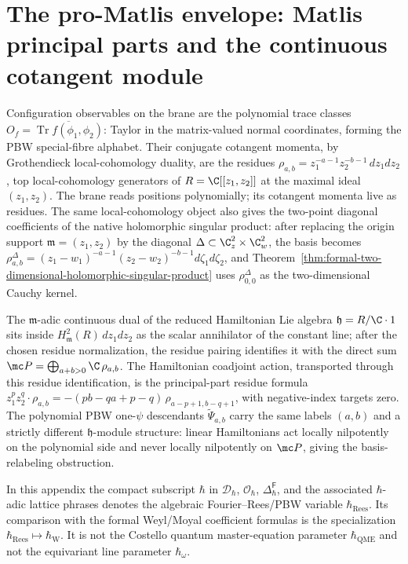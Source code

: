 \section{The pro-Matlis envelope: Matlis principal parts and the continuous cotangent module}\label{sec:pro-matlis-target}\label{sec:app-matlis-principal-parts}

Configuration observables on the brane are the polynomial trace
classes \(O_f=\overline{\operatorname{Tr}f(\phi_1,\phi_2)}\): Taylor
in the matrix-valued normal coordinates, forming the PBW
special-fibre alphabet.  Their conjugate cotangent momenta, by
Grothendieck local-cohomology duality, are the residues
\(\rho_{a,b}=z_1^{-a-1}z_2^{-b-1}\,dz_1dz_2\), top local-cohomology
generators of \(R=\C[[z_1,z_2]]\) at the maximal ideal \((z_1,z_2)\).
The brane reads positions polynomially; its cotangent momenta live as
residues.  The same local-cohomology object also gives the
two-point diagonal coefficients of the native holomorphic singular
product: after replacing
the origin support \(\mathfrak m=(z_1,z_2)\) by the diagonal
\(\Delta\subset\C^2_z\times\C^2_w\), the basis becomes
\(\rho^\Delta_{a,b}=(z_1-w_1)^{-a-1}(z_2-w_2)^{-b-1}d\zeta_1d\zeta_2\),
and Theorem~\ref{thm:formal-two-dimensional-holomorphic-singular-product} uses
\(\rho^\Delta_{0,0}\) as the two-dimensional Cauchy kernel.

The \(\mathfrak m\)-adic continuous dual of the reduced Hamiltonian Lie
algebra \(\mathfrak h=R/\C\cdot1\) sits inside
\(H^2_{\mathfrak m}(R)\,dz_1dz_2\) as the scalar annihilator of the
constant line; after the chosen residue normalization, the residue
pairing identifies it with the direct sum
\(\mc P=\bigoplus_{a+b>0}\C\,\rho_{a,b}\).  The Hamiltonian
coadjoint action, transported through this residue identification, is
the principal-part residue formula
\(z_1^p z_2^q\cdot\rho_{a,b}=-(pb-qa+p-q)\,\rho_{a-p+1,b-q+1}\), with
negative-index targets zero.  The polynomial PBW one-\(\psi\)
descendants \(\widetilde\Psi_{a,b}\) carry the same labels \((a,b)\) and
a strictly different \(\mathfrak h\)-module structure: linear
Hamiltonians act locally nilpotently on the polynomial side and never
locally nilpotently on \(\mc P\), giving the basis-relabeling
obstruction.

In this appendix the compact subscript \(\hbar\) in
\(\mathcal D_\hbar\), \(\mathcal O_\hbar\),
\(\Delta^{\mathsf F}_\hbar\), and the associated \(\hbar\)-adic lattice
phrases denotes the algebraic Fourier--Rees/PBW variable
\(\hbar_{\mathrm{Rees}}\).  Its comparison with the formal Weyl/Moyal
coefficient formulas is the specialization
\(\hbar_{\mathrm{Rees}}\mapsto\hbar_{\mathrm{W}}\).  It is not the
Costello quantum master-equation parameter \(\hbar_{\mathrm{QME}}\) and
not the equivariant line parameter \(\hbar_\omega\).

